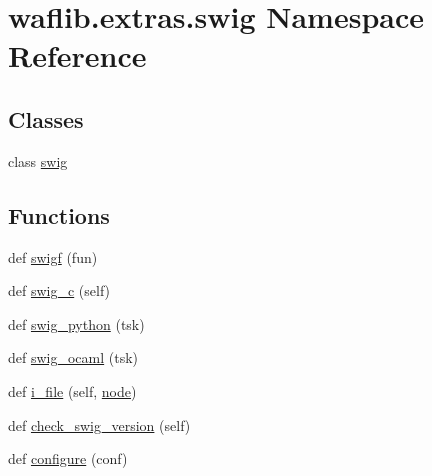 \hypertarget{namespacewaflib_1_1extras_1_1swig}{}\section{waflib.\+extras.\+swig Namespace Reference}
\label{namespacewaflib_1_1extras_1_1swig}
\subsection*{Classes}
\begin{DoxyCompactItemize}
\item 
class \hyperlink{classwaflib_1_1extras_1_1swig_1_1swig}{swig}
\end{DoxyCompactItemize}
\subsection*{Functions}
\begin{DoxyCompactItemize}
\item 
def \hyperlink{namespacewaflib_1_1extras_1_1swig_ac167fc53943712411170c236d19b6cad}{swigf} (fun)
\item 
def \hyperlink{namespacewaflib_1_1extras_1_1swig_ab4a8b82fa1b26655933614e461ebb312}{swig\+\_\+c} (self)
\item 
def \hyperlink{namespacewaflib_1_1extras_1_1swig_ac1ab20053e8097a9b1ff26e5b72a2cec}{swig\+\_\+python} (tsk)
\item 
def \hyperlink{namespacewaflib_1_1extras_1_1swig_a8185862e0e9a5dd529c24f393501a380}{swig\+\_\+ocaml} (tsk)
\item 
def \hyperlink{namespacewaflib_1_1extras_1_1swig_a162dd213fca31a91df49092d903d661e}{i\+\_\+file} (self, \hyperlink{structnode}{node})
\item 
def \hyperlink{namespacewaflib_1_1extras_1_1swig_aa092e071a257186fd7856f8cde75b9bb}{check\+\_\+swig\+\_\+version} (self)
\item 
def \hyperlink{namespacewaflib_1_1extras_1_1swig_a32919d2c8f55ad2eb696a2744f05c7ab}{configure} (conf)
\end{DoxyCompactItemize}
